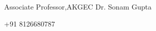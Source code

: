\begin{cventries}

  \cventry
    {Associate Professor,AKGEC} %
    {Dr. Sonam Gupta  } %
    {} %
    {} %
    {
      \begin{cvitems} %
        \item {+91 8126680787}
      \end{cvitems}
    } 
    

\end{cventries}
